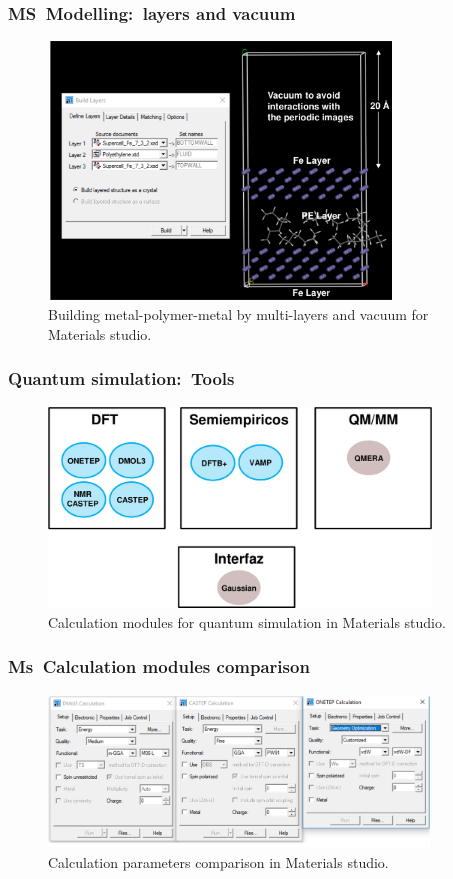 \frame
{
	\frametitle{\textrm{MS~Modelling:~layers and vacuum}}
\begin{figure}[h!]
\centering
\vspace*{-0.18in}
\includegraphics[height=2.70in,width=3.60in,viewport=0 0 1006 763,clip]{Figures/MS-Building_layer.png}
\caption{\tiny \textrm{Building metal-polymer-metal by multi-layers and vacuum for Materials studio.}}%
\label{MS-Building_layer}
\end{figure}
}

\frame
{
	\frametitle{\textrm{Quantum simulation:~Tools}}
\begin{figure}[h!]
\centering
\vspace*{-0.10in}
\includegraphics[height=2.10in,width=4.00in,viewport=0 0 1459 763,clip]{Figures/MS-Quantum_simulation-tools.png}
\caption{\tiny \textrm{Calculation modules for quantum simulation in Materials studio.}}%
\label{MS-Quantum_simulation}
\end{figure}
}

\frame
{
	\frametitle{\textrm{Ms~Calculation modules comparison}}
\begin{figure}[h!]
\centering
\vspace*{-0.10in}
\includegraphics[height=1.60in,width=4.00in,viewport=0 0 1517 602,clip]{Figures/MS-Caluculator-compare-1.png}
\caption{\tiny \textrm{Calculation parameters comparison in Materials studio.}}%
\label{MS-Module_parameters}
\end{figure}
}

